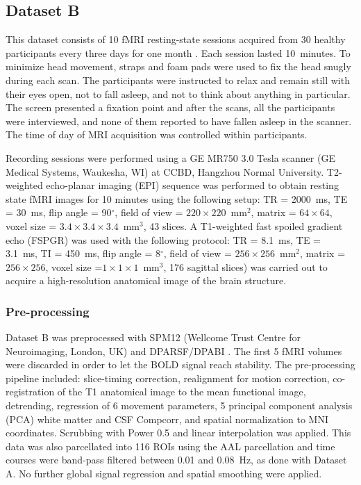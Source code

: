 \documentclass{article}
\begin{document}
\subsection{Dataset B}

This dataset consists of 10 fMRI resting-state sessions acquired from 30 healthy participants every three days for one month \cite{Zuo_SciData_2014}. Each session lasted 10~minutes.
To minimize head movement, straps and foam pads were used to fix the head snugly during each scan. The participants were instructed to relax and remain still with their eyes open, not to fall asleep, and not to think about anything in particular. The screen presented a fixation point and after the scans, all the participants were interviewed, and none of them reported to have fallen asleep in the scanner. The time of day of MRI acquisition was controlled within participants. 

Recording sessions were performed using a GE MR750 3.0 Tesla scanner (GE Medical Systems, Waukesha, WI) at CCBD, Hangzhou Normal University. T2-weighted echo-planar imaging (EPI) sequence was performed to obtain resting state fMRI images for 10 minutes using the following setup: TR = 2000~ms, TE = 30~ms, flip angle = 90$^\circ$, field of view = $220\times220$~mm$^2$, matrix = $64\times64$, voxel size = $3.4\times3.4\times3.4$~mm$^3$, 43 slices. A T1-weighted fast spoiled gradient echo (FSPGR) was used with the following protocol: TR = 8.1~ms, TE = 3.1~ms, TI = 450~ms, flip angle = 8$^\circ$, field of view = $256\times256$~mm$^2$, matrix = $256\times256$, voxel size =$1\times1\times1$~mm$^3$, 176 sagittal slices) was carried out to acquire a high-resolution anatomical image of the brain structure.

\subsubsection{Pre-processing}

Dataset B was preprocessed with SPM12 (Wellcome Trust Centre for Neuroimaging, London, UK) and DPARSF/DPABI \cite{Yan_Neuroinf_2016}.
The first 5 fMRI volumes were discarded in order to let the BOLD signal reach stability. The pre-processing pipeline included: slice-timing correction, realignment for motion correction, co-registration of the T1 anatomical image to the mean functional image, detrending, regression of 6 movement parameters, 5 principal component analysis (PCA) white matter and CSF Compcorr, and spatial normalization to MNI coordinates. Scrubbing with Power 0.5 and linear interpolation was applied. 
This data was also parcellated into 116 ROIs using the AAL parcellation \cite{Tzourio2002} and time courses were band-pass filtered between 0.01 and 0.08~Hz, as done with Dataset A. No further global signal regression and spatial smoothing were applied. 
\end{document}
